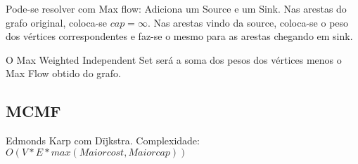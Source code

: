 Pode-se resolver com Max flow: Adiciona um Source e um Sink. Nas arestas do grafo original, coloca-se $cap=\infty$. Nas arestas vindo da source, coloca-se o peso dos v\'{e}rtices correspondentes e faz-se o mesmo para as arestas chegando em sink.

O Max Weighted Independent Set ser\'{a} a soma dos pesos dos v\'{e}rtices menos o Max Flow obtido do grafo.
\divisor

\subsection{MCMF}
Edmonds Karp com D\"{i}jkstra. Complexidade: $O(V*E*max(Maior cost,Maior cap))$
\divisor
